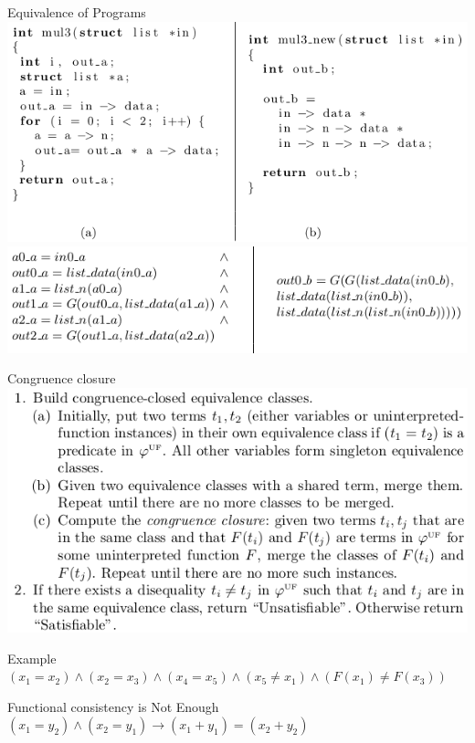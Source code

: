 \documentclass{beamer}
\begin{document}
\begin{frame}{Equivalence of Programs}
\includegraphics[scale=0.5]{mul3.png}
\includegraphics[scale=0.5]{mul3_ans.png}
\end{frame}

\begin{frame}{Congruence closure}
\includegraphics[scale=0.5]{Congruence_closure.png}
\end{frame}

\begin{frame}{Example}
$(x_1 = x_2) \wedge (x_2 = x_3) \wedge (x_4 = x_5) \wedge (x_5 \neq x_1) \wedge (F(x_1) \neq F(x_3))$
\end{frame}

\begin{frame}{Functional consistency is Not Enough}
$(x_1 = y_2) \wedge (x_2 = y_1) \rightarrow (x_1 + y_1) = (x_2 + y_2)$
\end{frame}
\end{document}
